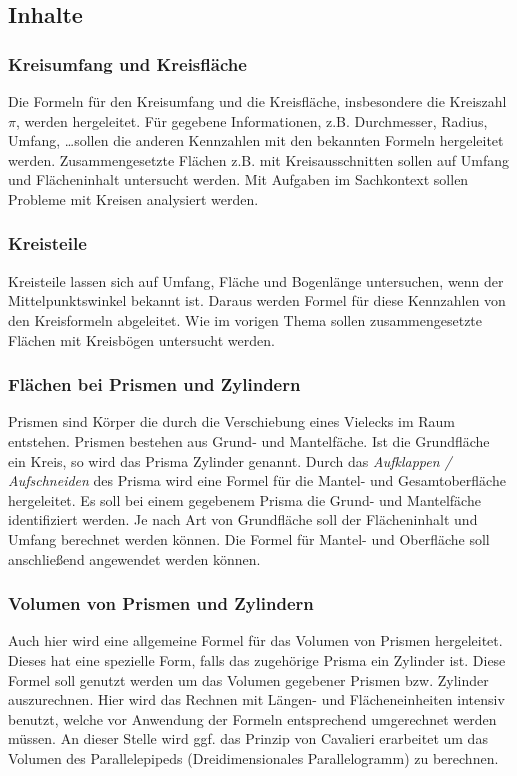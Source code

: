 \documentclass{article}
\begin{document}
\subsection{Inhalte}
\subsubsection*{Kreisumfang und Kreisfläche}
Die Formeln für den Kreisumfang und die Kreisfläche, insbesondere die Kreiszahl $\pi$, werden hergeleitet.
Für gegebene Informationen, z.B. Durchmesser, Radius, Umfang, \ldots sollen die anderen Kennzahlen mit den bekannten Formeln hergeleitet werden.
Zusammengesetzte Flächen z.B. mit Kreisausschnitten sollen auf Umfang und Flächeninhalt untersucht werden.
Mit Aufgaben im Sachkontext sollen Probleme mit Kreisen analysiert werden.
\subsubsection*{Kreisteile}
Kreisteile lassen sich auf Umfang, Fläche und Bogenlänge untersuchen, wenn der Mittelpunktswinkel bekannt ist.
Daraus werden Formel für diese Kennzahlen von den Kreisformeln abgeleitet.
Wie im vorigen Thema sollen zusammengesetzte Flächen mit Kreisbögen untersucht werden.
\subsubsection*{Flächen bei Prismen und Zylindern}
Prismen sind Körper die durch die Verschiebung eines Vielecks im Raum entstehen. Prismen bestehen aus Grund- und Mantelfäche. Ist die Grundfläche ein Kreis, so wird das Prisma Zylinder genannt.
Durch das \textit{Aufklappen / Aufschneiden} des Prisma wird eine Formel für die Mantel- und Gesamtoberfläche hergeleitet.
Es soll bei einem gegebenem Prisma die Grund- und Mantelfäche identifiziert werden.
Je nach Art von Grundfläche soll der Flächeninhalt und Umfang berechnet werden können. Die Formel für Mantel- und Oberfläche soll anschließend angewendet werden können.
\subsubsection*{Volumen von Prismen und Zylindern}
Auch hier wird eine allgemeine Formel für das Volumen von Prismen hergeleitet. Dieses hat eine spezielle Form, falls das zugehörige Prisma ein Zylinder ist.
Diese Formel soll genutzt werden um das Volumen gegebener Prismen bzw. Zylinder auszurechnen.
Hier wird das Rechnen mit Längen- und Flächeneinheiten intensiv benutzt, welche vor Anwendung der Formeln entsprechend umgerechnet werden müssen.
An dieser Stelle wird ggf. das Prinzip von Cavalieri erarbeitet um das Volumen des Parallelepipeds (Dreidimensionales Parallelogramm) zu berechnen.
\end{document}
